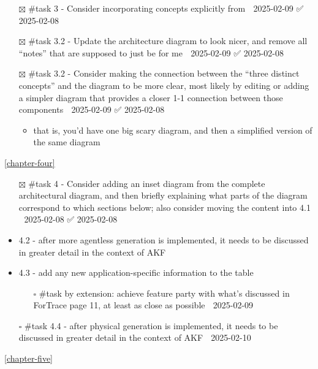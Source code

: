 \begin{itemize}
\tightlist
\item[$\boxtimes$]
  \#task 3 - Consider incorporating concepts explicitly from
  \cite{horsmanDatasetConstructionChallenges2021} 📅 2025-02-09 ✅
  2025-02-08
\item[$\boxtimes$]
  \#task 3.2 - Update the architecture diagram to look nicer, and remove
  all ``notes'' that are supposed to just be for me 📅 2025-02-09 ✅
  2025-02-08
\item[$\boxtimes$]
  \#task 3.2 - Consider making the connection between the ``three
  distinct concepts'' and the diagram to be more clear, most likely by
  editing or adding a simpler diagram that provides a closer 1-1
  connection between those components 📅 2025-02-09 ✅ 2025-02-08

  \begin{itemize}
  \tightlist
  \item
    that is, you'd have one big scary diagram, and then a simplified
    version of the same diagram
  \end{itemize}
\end{itemize}

\autoref{chapter-four}

\begin{itemize}
\tightlist
\item[$\boxtimes$]
  \#task 4 - Consider adding an inset diagram from the complete
  architectural diagram, and then briefly explaining what parts of the
  diagram correspond to which sections below; also consider moving the
  content into 4.1 📅 2025-02-08 ✅ 2025-02-08
\item
  4.2 - after more agentless generation is implemented, it needs to be
  discussed in greater detail in the context of AKF
\item
  4.3 - add any new application-specific information to the table

  \begin{itemize}
  \tightlist
  \item[$\square$]
    \#task by extension: achieve feature party with what's discussed in
    ForTrace page 11, at least as close as possible 📅 2025-02-09
  \end{itemize}
\item[$\square$]
  \#task 4.4 - after physical generation is implemented, it needs to be
  discussed in greater detail in the context of AKF 📅 2025-02-10
\end{itemize}

\autoref{chapter-five}

